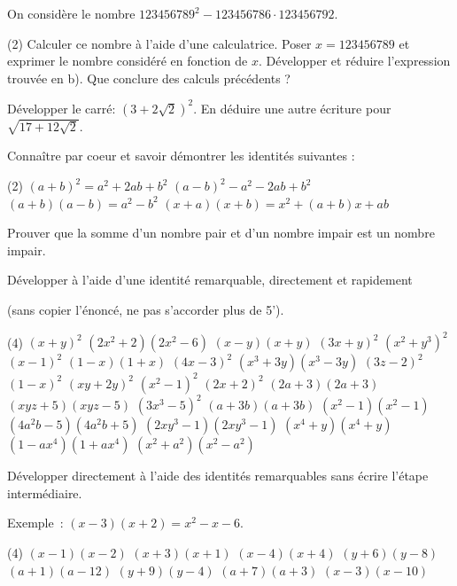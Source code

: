 \documentclass[a4paper,12pt]{report}
\begin{document}
\begin{acti}
On considère le nombre $123456789^2-123456786 \cdot 123456792$.
\begin{tasks}(2)
\task Calculer ce nombre à l'aide d'une calculatrice.
\task Poser $x=123456789$ et exprimer le nombre considéré en fonction de $x$.
\task Développer et réduire l'expression trouvée en b).
\task Que conclure des calculs précédents ?
\end{tasks}	
\end{acti}
\begin{acti}
Développer le carré: $(3+2 \sqrt{2})^2$. En déduire une autre écriture pour $\sqrt{17+12 \sqrt{2}}$.
\end{acti}
\begin{exo}
Connaître par coeur et savoir démontrer les identités suivantes :
\begin{tasks}(2)
\task $(a+b)^2=a^2+2 a b+b^2$
\task $(a-b)^2-a^2-2 a b+b^2$
\task $(a+b)(a-b)=a^2-b^2$
\task $(x+a)(x+b)=x^2+(a+b) x+a b$
\end{tasks}
\end{exo}
\begin{exo}
Prouver que la somme d'un nombre pair et d'un nombre impair est un nombre impair.
\end{exo}
\begin{exo}
Développer à l'aide d'une identité remarquable, directement et rapidement 

(sans copier l'énoncé, ne pas s'accorder plus de 5').
	\begin{tasks}(4)
\task $(x+y)^2$
\task $(2x^2+2)(2x^2-6)$
\task $(x-y)(x+y)$
\task $(3 x+y)^2$
\task $\left(x^2+y^3\right)^2$
\task $(x-1)^2$
\task $(1-x)(1+x)$
\task $(4 x-3)^2$
\task $\left(x^3+3 y\right)\left(x^3-3 y\right)$
\task $(3 z-2)^2$
\task $(1-x)^2$
\task $(x y+2 y)^2$
\task $\left(x^2-1\right)^2$
\task $(2 x+2)^2$
\task $(2 a+3)(2 a+3)$
\task $(x y z+5)(x y z-5)$
\task $\left(3 x^3-5\right)^2$
\task $(a+3 b)(a+3 b)$
\task $\left(x^2-1\right)\left(x^2-1\right)$
\task $\left(4 a^2 b-5\right)\left(4 a^2 b+5\right)$
\task $\left(2 x y^3-1\right)\left(2 x y^3-1\right)$
\task $\left(x^4+y\right)\left(x^4+y\right)$
\task $\left(1-a x^4\right)\left(1+a x^4\right)$
\task $\left(x^2+a^2\right)\left(x^2-a^2\right)$
	\end{tasks}
\end{exo}
\begin{exo}
Développer directement à l'aide des identités remarquables sans écrire l'étape intermédiaire.

Exemple~: $(x-3)(x+2)=x^2-x-6$.
	\begin{tasks}(4)
\task $(x-1)(x-2)$
\task $(x+3)(x+1)$
\task $(x-4)(x+4)$
\task $(y+6)(y-8)$
\task $(a+1)(a-12)$
\task $(y+9)(y-4)$
\task $(a+7)(a+3)$
\task $(x-3)(x-10)$
	\end{tasks}
\end{exo}
\end{document}
